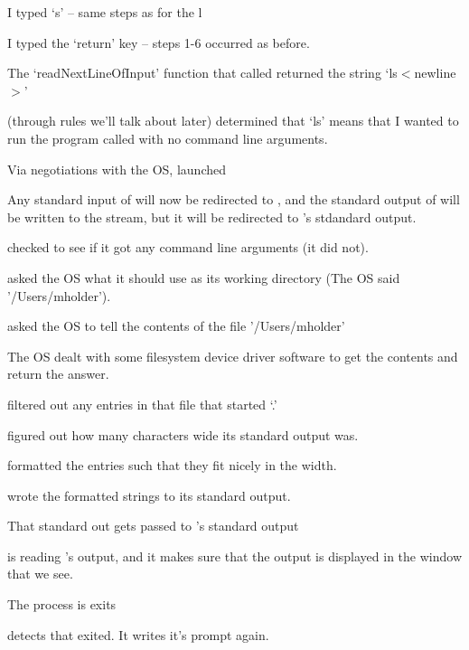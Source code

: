 \documentclass[landscape]{foils}
\begin{document}
\begin{compactitem}
	\item I typed `s' -- same steps as for the l
	\item I typed the `return' key -- steps 1-6 occurred as before.
	\item {\color{red}The `readNextLineOfInput' function that  called returned the string `ls$<$newline$>$'}
	\item {\color{red} (through rules we'll talk about later) determined that `ls' means that I wanted to run the program called  with no command line arguments.}
	\item Via negotiations with the OS, {\color{red} launched }
	\item Any standard input of  will now be redirected to , and the standard output of  will be written to the stream, but it will be redirected to 's stdandard output.
	\item {} checked to see if it got any command line arguments (it did not).
	\item {} asked the OS what it should use as its working directory (The OS said '/Users/mholder').
	\item {} asked the OS to tell the contents of the file '/Users/mholder'
	\item The OS dealt with some filesystem device driver software to get the contents and return the answer.
	\item {} filtered out any entries in that file that started `.'
	\item {} figured out how many characters wide its standard output was.
	\item {} formatted the entries such that they fit nicely in the width.
	\item {} wrote the formatted strings to its standard output.
	\item {\color{red}That standard out gets passed to 's standard output}
	\item {\color{green} is reading 's output, and it makes sure that the output is displayed in the window that we see.}
	\item The  process is exits
	\item {\color{red} detects that  exited. It writes it's prompt again.}
	
		
\end{compactitem}
\end{document}
